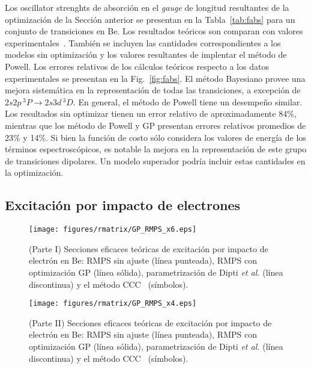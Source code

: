Los oscillator strenghts de absorción en el \textit{gauge} de longitud 
resultantes de la optimización de la Sección anterior se presentan en 
la Tabla~\ref{tab:fabs} para un conjunto de transiciones en Be. Los 
resultados teóricos son comparan con valores experimentales~\cite{NIST}.
También se incluyen las cantidades correspondientes a los modelos sin 
optimización y los valores resultantes de implentar el método de Powell.
Los errores relativos de los cálculos teóricos respecto a los datos 
experimentales se presentan en la Fig.~\ref{fig:fabs}. El método 
Bayesiano provee una mejora sistemática en la representación de todas 
las transiciones, a excepción de $2s2p\,^3P\rightarrow 2s3d\,^3D$. 
En general, el método de Powell tiene un desempeño similar. Los 
resultados sin optimizar tienen un error relativo de aproximadamente  
84\%, mientras que los método de Powell y GP presentan errores relativos 
promedios de 23\% y 14\%. Si bien la función de costo sólo considera los 
valores de energía de los términos espectroscópicos, es notable la 
mejora en la representación de este grupo de transiciones dipolares.
Un modelo superador podría incluir estas cantidades en la optimización.

\subsection{Excitación por impacto de electrones}

\begin{figure}
\centering
\texttt{[image: figures/rmatrix/GP\_RMPS\_x6.eps]} 
\caption[Secciones eficaces de excitación de Be (Parte I).]
{(Parte I) Secciones eficaces teóricas de excitación por impacto de 
electrón en Be: RMPS sin ajuste (línea punteada), RMPS con optimización 
GP (línea sólida), parametrización de Dipti \textit{et al.}
\cite{Dipti:19} (línea discontinua) y el método CCC~\cite{Fursa:97} 
(símbolos).}
\label{fig:crossBe-partI}
\end{figure}

\begin{figure}
\centering
\texttt{[image: figures/rmatrix/GP\_RMPS\_x4.eps]} 
\caption[Secciones eficaces de excitación de Be (Parte II).]
{(Parte II) Secciones eficaces teóricas de excitación por impacto de 
electrón en Be: RMPS sin ajuste (línea punteada), RMPS con optimización 
GP (línea sólida), parametrización de Dipti \textit{et al.}
\cite{Dipti:19} (línea discontinua) y el método CCC~\cite{Fursa:97}
(símbolos).}
\label{fig:crossBe-partII}
\end{figure}

